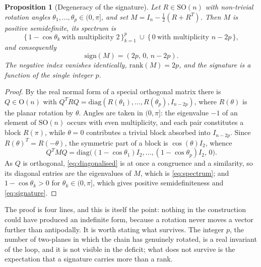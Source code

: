 \documentclass{article}
\theoremstyle{plain}
\newtheorem{proposition}[theorem]{Proposition}
\theoremstyle{definition}
\numberwithin{equation}{section}
\newcommand{\SO}{\mathrm{SO}}
\newcommand{\Ort}{\mathrm{O}}
\newcommand{\sgn}{\mathrm{sign}}
\begin{document}
\begin{proposition}[Degeneracy of the signature]\label{prop:sig}
Let $R \in \SO(n)$ with non-trivial rotation angles
$\theta_1,\dots,\theta_p \in (0,\pi]$, and set
$M = I_n - \tfrac12(R+R^T)$. Then $M$ is positive semidefinite, its
spectrum is
\begin{equation}\label{eq:spectrum}
\bigl\{\, 1 - \cos\theta_k \ \text{with multiplicity } 2 \,\bigr\}_{k=1}^{p}
\ \cup\ \bigl\{\, 0 \ \text{with multiplicity } n-2p \,\bigr\},
\end{equation}
and consequently
\begin{equation}\label{eq:signature}
\sgn(M) = (2p,\, 0,\, n-2p).
\end{equation}
The negative index vanishes identically, $\mathrm{rank}(M) = 2p$, and
the signature is a function of the single integer $p$.
\end{proposition}

\begin{proof}
By the real normal form of a special orthogonal matrix there is
$Q \in \Ort(n)$ with
$Q^T R Q = \mathrm{diag}(R(\theta_1),\dots,R(\theta_p),I_{n-2p})$, where
$R(\theta)$ is the planar rotation by $\theta$. Angles are taken in
$(0,\pi]$: the eigenvalue $-1$ of an element of $\SO(n)$ occurs with
even multiplicity, and each pair constitutes a block $R(\pi)$, while
$\theta = 0$ contributes a trivial block absorbed into $I_{n-2p}$. Since
$R(\theta)^T = R(-\theta)$, the symmetric part of a block is
$\cos(\theta)I_2$, whence
\begin{equation}\label{eq:diagonalised}
Q^T M Q = \mathrm{diag}\bigl((1-\cos\theta_1)I_2,\dots,
(1-\cos\theta_p)I_2,\,0\bigr).
\end{equation}
As $Q$ is orthogonal, \eqref{eq:diagonalised} is at once a congruence
and a similarity, so its diagonal entries are the eigenvalues of $M$,
which is \eqref{eq:spectrum}; and $1-\cos\theta_k > 0$ for
$\theta_k \in (0,\pi]$, which gives positive semidefiniteness and
\eqref{eq:signature}.
\end{proof}

The proof is four lines, and this is itself the point: nothing in the
construction could have produced an indefinite form, because a rotation
never moves a vector further than antipodally. It is worth stating what
survives. The integer $p$, the number of two-planes in which the chain
has genuinely rotated, is a real invariant of the loop, and it is not
visible in the deficit; what does not survive is the expectation that a
signature carries more than a rank.
\end{document}
